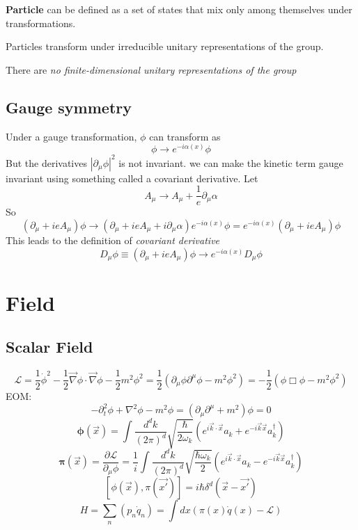 \textbf{Particle} can be defined as a set of states that mix only among
themselves under \Poincare{} transformations.

Particles transform under irreducible unitary representations of the
\Poincare{} group.

There are \emph{no finite-dimensional unitary representations of the
\Poincare{} group}

\subsection{Gauge symmetry}
Under a gauge transformation, $\phi$ can transform as 
\[
    \phi\rightarrow e^{-i\alpha(x)}\phi
    \]
But the derivatives $|\partial_\mu \phi|^2$ is not invariant. we can make
the kinetic term gauge invariant using something called a covariant
derivative. Let
\[
    A_\mu \rightarrow A_\mu + \frac{1}{e}\partial_\mu \alpha
    \]
So
\[
    (\partial_\mu+ieA_\mu)\phi\rightarrow(\partial_\mu+ieA_\mu+i\partial_\mu\alpha)e^{-i\alpha(x)}\phi=e^{-i\alpha(x)}(\partial_\mu+ieA_\mu)\phi
    \]
This leads to the definition of \emph{covariant derivative}
\[
    D_\mu\phi\equiv(\partial_\mu+ieA_\mu)\phi\rightarrow{e^{-i\alpha(x)}D_\mu\phi}
    \]
\section{Field}
\subsection{Scalar Field}
\[ \mathcal{L} = \frac{1}{2}\dot{\phi}^{2} -
\frac{1}{2}\vec{\nabla}\phi \cdot \vec{\nabla}\phi - \frac{1}{2}m^{2}\phi^{2} 
= \frac{1}{2}(\partial_{\mu}\phi\partial^{\mu}\phi - m^{2}\phi^{2}) 
=-\frac{1}{2}(\phi\Box\phi-m^2\phi^2)	\]
EOM:
$$ -\partial_{t}^{2}\phi + \nabla^{2}\phi - m^{2}\phi =
(\partial_{\mu}\partial^{\mu} + m^{2}) \phi = 0 $$
$$ \pmb{\phi}(\vec{x}) = \int
\frac{d^{d}k}{(2\pi)^{d}}\sqrt{\frac{\hbar}{2\omega_{k}}}(e^{i\vec{k}\cdot\vec{x}}a_{k}+e^{-i\vec{k}\vec{x}}a_{k}^{\dag})$$
$$ \pmb{\pi}(\vec{x}) = \frac{\partial{\mathcal{L}}}{\partial_{\mu}\phi} =
\frac{1}{i} \int \frac{d^{d}k}{(2\pi)^{d}}\sqrt{\frac{\hbar\omega_{k}}{2}}(e^{i\vec{k}\cdot\vec{x}}a_{k}-e^{-i\vec{k}\vec{x}}a_{k}^{\dag}) $$
$$ [\phi(\vec{x}), \pi(\vec{x'})] = i\hbar\delta^{d}(\vec{x} - \vec{x'})$$
$$ H =\sum_{n}(p_{n}\dot{q}_n) = \int dx(\pi(x)\dot{q}(x) -
\mathcal{L})  $$

